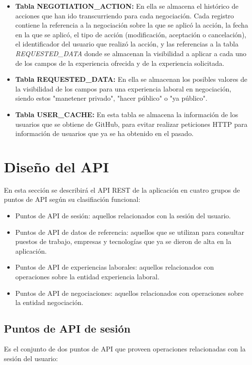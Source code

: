 \documentclass[a4paper, 12pt]{book}
\begin{document}
\begin{itemize}
	\item \textbf{Tabla NEGOTIATION\_ACTION:} En ella se almacena el histórico de acciones que han ido transcurriendo para cada negociación.
	Cada registro contiene la referencia a la negociación sobre la que se aplicó la acción, la fecha en la que se aplicó, el tipo de acción (modificación, aceptación o cancelación), el identificador del usuario que realizó la acción,
	y las referencias a la tabla \emph{REQUESTED\_DATA} donde se almacenan la visibilidad a aplicar a cada uno de los campos de la experiencia ofrecida y de la experiencia solicitada.
	\item \textbf{Tabla REQUESTED\_DATA:} En ella se almacenan los posibles valores de la visibilidad de los campos para una experiencia laboral en negociación, siendo estos "manetener privado", "hacer público" o "ya público".
	\item \textbf{Tabla USER\_CACHE:} En esta tabla se almacena la información de los usuarios que se obtiene de GitHub, para evitar realizar peticiones HTTP para información de usuarios que ya se ha obtenido en el pasado.
	\end{itemize}


\section{Diseño del API}
\label{sec:api_desing}
En esta sección se describirá el API REST de la aplicación en cuatro grupos de puntos de API según su clasifiación funcional:

		\begin{itemize}
		\item Puntos de API de sesión: aquellos relacionados con la sesión del usuario.
		\item Puntos de API de datos de referencia: aquellos que se utilizan para consultar puestos de trabajo, empresas y tecnologías que ya se dieron de alta en la aplicación.
		\item Puntos de API de experiencias laborales: aquellos relacionados con operaciones sobre la entidad experiencia laboral.
		\item Puntos de API de negociaciones: aquellos relacionados con operaciones sobre la entidad negociación.
		\end{itemize}

\subsection{Puntos de API de sesión}
\label{subsec:session_endpoints}
Es el conjunto de dos puntos de API que proveen operaciones relacionadas con la sesión del usuario:
\end{document}
